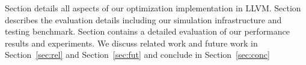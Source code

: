 Section details all aspects of our optimization implementation in LLVM. Section
describes the evaluation details including our simulation infrastructure and
testing benchmark.  Section contains a detailed evaluation of our performance
results and experiments.  We discuss related work and future work in
Section~\ref{sec:rel}
and Section~\ref{sec:fut} and conclude in Section~\ref{sec:conc}
